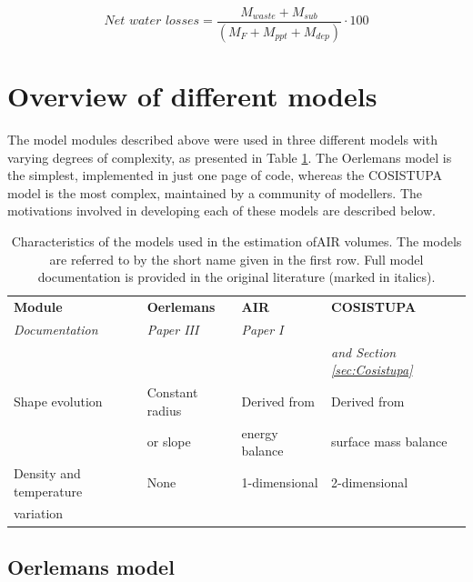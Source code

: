 \begin{equation} \textit{Net water losses} = \frac{M_{waste}+M_{sub}}{(M_F+M_{ppt}+M_{dep})} \cdot 100 \end{equation}

\section{Overview of different models}
\label{sec:MIP}

The model modules described above were used in three different models with varying degrees of complexity, as
presented in Table \ref{tab:MIP}. The Oerlemans model is the simplest, implemented in just one page of code, whereas
the COSISTUPA model is the most complex, maintained by a community of modellers. The motivations involved
in developing each of these models are described below.

\begin{table}[ht]
	\centering
  \caption{Characteristics of the models used in the estimation of\ac{AIR} volumes. The models are referred to by
  the short name given in the first row. Full model documentation is provided in the original literature (marked in
  italics). }      

	\label{tab:MIP}
	\begin{tabular}{|llll|}
		\hline
		\textbf{Module}        & \textbf{Oerlemans} & \textbf{AIR} & \textbf{COSISTUPA}     \\ 
		\textit{Documentation} & \textit{Paper III} & \textit{Paper I} & \textit{\citet{sauterCOSIPYV1Opensource2020}} \\ 
		                       &                    &                  & \textit{and Section \ref{sec:Cosistupa}}     \\ \hline
		Shape evolution        & Constant radius     & Derived from  & Derived from        \\
                           & or slope            & energy balance & surface mass balance        \\\hline
		Density and temperature& None & 1-dimensional   & 2-dimensional   \\
		variation              &           &        & \\ \hline
	\end{tabular}
\end{table}

\subsection{Oerlemans model}

